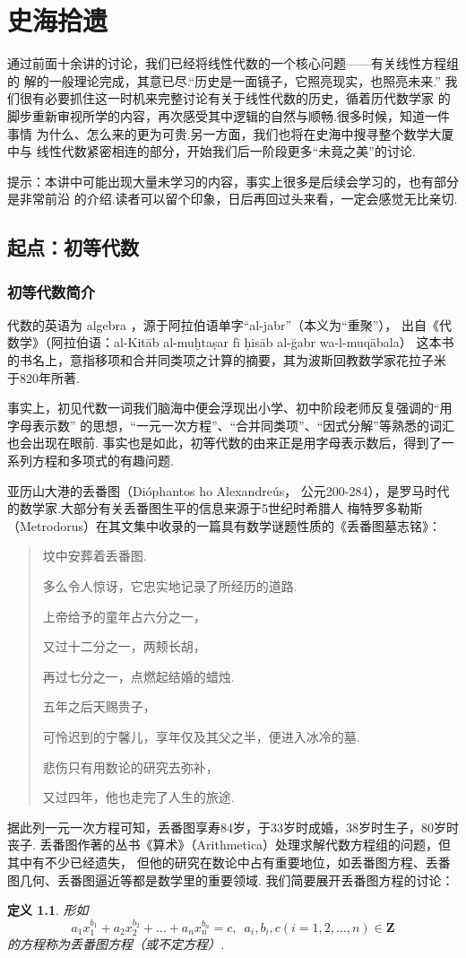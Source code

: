 \documentclass{ctexbook}
\newtheorem{definition}{定义}[chapter] %
\begin{document}
\chapter{史海拾遗}

通过前面十余讲的讨论，我们已经将线性代数的一个核心问题——有关线性方程组的
解的一般理论完成，其意已尽.``历史是一面镜子，它照亮现实，也照亮未来.''
我们很有必要抓住这一时机来完整讨论有关于线性代数的历史，循着历代数学家
的脚步重新审视所学的内容，再次感受其中逻辑的自然与顺畅.很多时候，知道一件事情
为什么、怎么来的更为可贵.另一方面，我们也将在史海中搜寻整个数学大厦中与
线性代数紧密相连的部分，开始我们后一阶段更多``未竟之美''的讨论.

提示：本讲中可能出现大量未学习的内容，事实上很多是后续会学习的，也有部分是非常前沿
的介绍.读者可以留个印象，日后再回过头来看，一定会感觉无比亲切.

\section{起点：初等代数}
\subsection{初等代数简介}
代数的英语为 algebra ，源于阿拉伯语单字``al-jabr''（本义为``重聚''），
出自《代数学》（阿拉伯语：al-Kitāb al-muḫtaṣar fī ḥisāb al-ğabr wa-l-muqābala）
这本书的书名上，意指移项和合并同类项之计算的摘要，其为波斯回教数学家花拉子米
于820年所著.

事实上，初见代数一词我们脑海中便会浮现出小学、初中阶段老师反复强调的``用字母表示数''
的思想，``一元一次方程''、``合并同类项''、``因式分解''等熟悉的词汇也会出现在眼前.
事实也是如此，初等代数的由来正是用字母表示数后，得到了一系列方程和多项式的有趣问题.

亚历山大港的丢番图（Dióphantos ho Alexandreús，
公元200-284），是罗马时代的数学家.大部分有关丢番图生平的信息来源于5世纪时希腊人
梅特罗多勒斯（Metrodorus）在其文集中收录的一篇具有数学谜题性质的《丢番图墓志铭》：
\begin{quote}
    \kaishu
    坟中安葬着丢番图.

    多么令人惊讶，它忠实地记录了所经历的道路.

    上帝给予的童年占六分之一，

    又过十二分之一，两颊长胡，

    再过七分之一，点燃起结婚的蜡烛.

    五年之后天赐贵子，

    可怜迟到的宁馨儿，享年仅及其父之半，便进入冰冷的墓.

    悲伤只有用数论的研究去弥补，

    又过四年，他也走完了人生的旅途.
\end{quote}
据此列一元一次方程可知，丢番图享寿84岁，于33岁时成婚，38岁时生子，80岁时丧子.
丢番图作著的丛书《算术》（Arithmetica）处理求解代数方程组的问题，但其中有不少已经遗失，
但他的研究在数论中占有重要地位，如丢番图方程、丢番图几何、丢番图逼近等都是数学里的重要领域.
我们简要展开丢番图方程的讨论：
\begin{definition}
    形如
    \[a_1x_1^{b_1}+a_2x_2^{b_2}+\ldots+a_nx_n^{b_n}=c,\enspace a_i,b_i,c(i=1,2,\ldots,n)\in\mathbf{Z}\]
    的方程称为丢番图方程（或不定方程）.
\end{definition}
\end{document}
